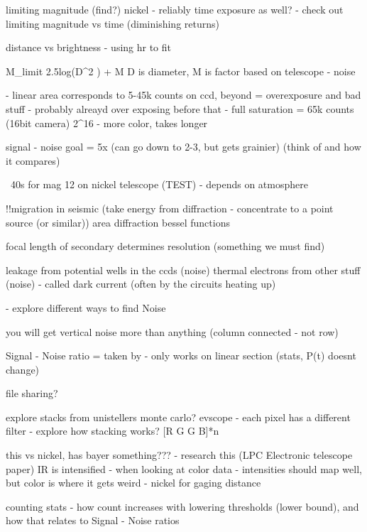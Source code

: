 limiting magnitude (find?)
nickel - reliably
    time exposure as well?
    - check out limiting magnitude vs time (diminishing returns)

distance vs brightness - using hr to fit

M_limit \approx 2.5log(D^2 \times {}) + M 
D is diameter, M is factor based on telescope - noise

    - linear area corresponds to 5-45k counts on ccd, beyond = overexposure and bad stuff
    - probably alreayd over exposing before that
    - full saturation = 65k counts (16bit camera) 2^16
    - more color, takes longer

signal - noise
goal  = 5x (can go down to 2-3, but gets grainier)
(think of \rho and how it compares)

~40s for mag 12 on nickel telescope (TEST)
    - depends on atmosphere

!!migration in seismic (take energy from diffraction - concentrate to a point source (or similar))
area diffraction
bessel functions

focal length of secondary determines resolution (something we must find)

leakage from potential wells in the ccds (noise)
thermal electrons from other stuff (noise) - called dark current (often by the circuits heating up)

    - explore different ways to find Noise

you will get vertical noise more than anything (column connected - not row)

Signal - Noise ratio = taken by  - only works on linear section (stats, P(t) doesnt change)

file sharing?

explore stacks from unistellers
monte carlo? 
evscope - each pixel has a different filter - explore how stacking works?
[R G 
 G B]*n


this vs nickel, has bayer something??? - research this (LPC Electronic telescope paper)
IR is intensified - when looking at color data
    - intensities should map well, but color is where it gets weird
    - nickel for gaging distance



counting stats - how count increases with lowering thresholds (lower bound), and how that relates to Signal - Noise ratios

